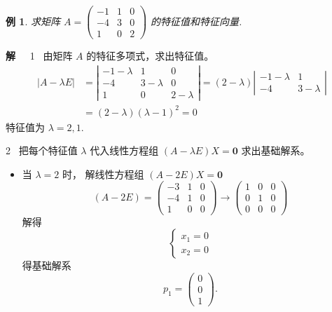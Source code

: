\documentclass[13pt]{beamer}
\newtheorem{exa}{例}
\def\sol{{\bf 解~~ }}
\begin{document}
\begin{frame}
\begin{exa}
求矩阵 $A=\left(\begin{array}{ccc}-1 & 1 & 0 \\ -4 & 3 & 0 \\ 1 & 0 & 2\end{array}\right)$ 的特征值和特征向量.
\end{exa}
\sol 1~ 由矩阵 $A$ 的特征多项式，求出特征值。
\[
\begin{aligned}
|A-\lambda E| &=\left|\begin{array}{ccc}
-1-\lambda & 1 & 0 \\
-4 & 3-\lambda & 0 \\
1 & 0 & 2-\lambda
\end{array}\right|=(2-\lambda)\left|\begin{array}{cc}
-1-\lambda & 1 \\
-4 & 3-\lambda
\end{array}\right| \\
&=(2-\lambda)(\lambda-1)^{2}=0
\end{aligned}
\]
特征值为 $\lambda=2,1$.
\end{frame}


\begin{frame}
2~ 把每个特征值 $\lambda$ 代入线性方程组 $(A-\lambda E) X=\mathbf{0}$
求出基础解系。
\begin{itemize}
	\item 当 $\lambda={2}$ 时， 解线性方程组 $(A-2 E) X=\mathbf{0}$
\[
(A-2 E)=\left(\begin{array}{ccc}
-3 & 1 & 0 \\
-4 & 1 & 0 \\
1 & 0 & 0
\end{array}\right) \rightarrow\left(\begin{array}{ccc}
1 & 0 & 0 \\
0 & 1 & 0 \\
0 & 0 & 0
\end{array}\right)
\]
解得
\[
\left\{\begin{array}{l}{x}_{1}={0} \\ {x}_{2}={0}\end{array}\right.
\]
得基础解系  
\[
{p}_{1}=\left(\begin{array}{l} {0} \\ {0} \\ {1}\end{array}\right).
\]
\end{itemize}
\end{frame}
\end{document}
